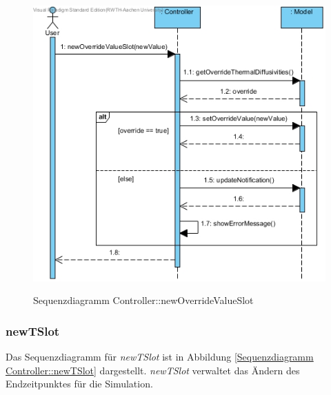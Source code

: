 \begin{figure}[H]
	\centering
	\includegraphics[scale=.65]{Bilder/Controller__newOverrideValueSlot().jpg}\\
	\caption{Sequenzdiagramm Controller::newOverrideValueSlot}
	\label{Sequenzdiagramm Controller::newOverrideValueSlot}
\end{figure}

\subsubsection*{newTSlot}

Das Sequenzdiagramm für \emph{newTSlot} ist in Abbildung \ref{Sequenzdiagramm Controller::newTSlot} dargestellt. \emph{newTSlot} verwaltet das Ändern des Endzeitpunktes für die Simulation.

